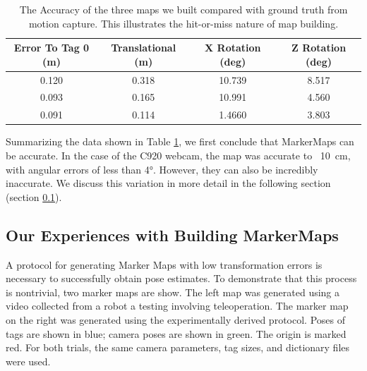 \documentclass{article}
\begin{document}
    \begin{table}[H]
      \centering
      \begin{tabular}{|c|c|c|c|} \hline
        Error To Tag 0 (m) & Translational (m) & X Rotation (deg) & Z Rotation (deg) \\ \hline
        0.120 & 0.318 & 10.739 & 8.517 \\ \hline
        0.093 & 0.165 & 10.991 & 4.560 \\ \hline
        0.091 & 0.114 & 1.4660 & 3.803 \\ \hline
      \end{tabular}
      \caption{The Accuracy of the three maps we built compared with ground truth from motion capture. This illustrates the hit-or-miss nature of map building.}
      \label{table:markermapper_accuracy}
    \end{table}

    Summarizing the data shown in Table \ref{table:markermapper_accuracy}, we first conclude that MarkerMaps can be accurate. In the case of the C920 webcam, the map was accurate to ~\SI{10}{\centi\meter}, with angular errors of less than \ang{4}. However, they can also be incredibly inaccurate. We discuss this variation in more detail in the following section (section \ref{section:building_maps_sucks}).

	\subsection{Our Experiences with Building MarkerMaps} \label{section:building_maps_sucks}
    A protocol for generating Marker Maps with low transformation errors is necessary to successfully obtain pose estimates. To demonstrate that this process is nontrivial, two marker maps are show. The left map was generated using a video collected from a robot a testing involving teleoperation. The marker map on the right was generated using the experimentally derived protocol. Poses of tags are shown in blue; camera poses are shown in green. The origin is marked red. For both trials, the same camera parameters, tag sizes, and dictionary files were used.
\end{document}
